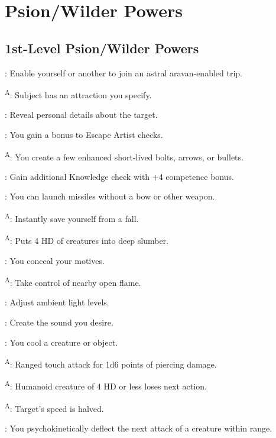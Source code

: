\section{Psion/Wilder Powers}




\subsection{1st-Level Psion/Wilder Powers}

: Enable yourself or another to join an astral  aravan-enabled trip.

\textsuperscript{A}: Subject has an attraction you specify.

: Reveal personal details about the target.

: You gain a bonus to Escape Artist checks.

\textsuperscript{A}: You create a few enhanced short-lived bolts, arrows, or bullets.

: Gain additional Knowledge check with +4 competence bonus.

: You can launch missiles without a bow or other weapon.

\textsuperscript{A}: Instantly save yourself from a fall.

\textsuperscript{A}: Puts 4 HD of creatures into deep slumber.

: You conceal your motives.

\textsuperscript{A}: Take control of nearby open flame.

: Adjust ambient light levels.

: Create the sound you desire.

: You cool a creature or object.

\textsuperscript{A}: Ranged touch attack for 1d6 points of piercing damage.

\textsuperscript{A}: Humanoid creature of 4 HD or less loses next action.

\textsuperscript{A}: Target’s speed is halved.

: You psychokinetically deflect the next attack of a creature within range.

